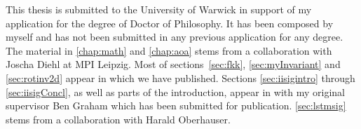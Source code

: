 \documentclass[11pt,a4paper]{report}      %
\begin{document}
\begin{thesisdeclaration}        %
This thesis is submitted to the University of Warwick in support of my application for the degree of Doctor of Philosophy. 
It has been composed by myself and has not been submitted in any previous application for any degree.
The material in \autoref{chap:math} and \autoref{chap:aoa} stems from a collaboration with Joscha Diehl at MPI Leipzig. Most of sections~\ref{sec:fkk}, \ref{sec:myInvariant} and \ref{sec:rotinv2d} appear in \cite{invariants} which we have published.
Sections \ref{sec:iisigintro} through \ref{sec:iisigConcl}, as well as parts of the introduction,  
appear in \cite{iisigPaper} with my original supervisor Ben Graham which has been submitted for publication.
\autoref{sec:lstmsig} stems from a collaboration with Harald Oberhauser.

\end{thesisdeclaration}
\end{document}
